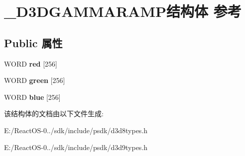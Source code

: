 \hypertarget{struct___d3_d_g_a_m_m_a_r_a_m_p}{}\section{\+\_\+\+D3\+D\+G\+A\+M\+M\+A\+R\+A\+M\+P结构体 参考}
\label{struct___d3_d_g_a_m_m_a_r_a_m_p}
\subsection*{Public 属性}
\begin{DoxyCompactItemize}
\item 
\mbox{\label{struct___d3_d_g_a_m_m_a_r_a_m_p_ae79ba9b3cac1e68a6ad7652c7656b326}} 
W\+O\+RD {\bfseries red} \mbox{[}256\mbox{]}
\item 
\mbox{\label{struct___d3_d_g_a_m_m_a_r_a_m_p_ac8f26de7d35e10bb998ff7939c88db70}} 
W\+O\+RD {\bfseries green} \mbox{[}256\mbox{]}
\item 
\mbox{\label{struct___d3_d_g_a_m_m_a_r_a_m_p_a4b75736477790d095dc1954ff6c8ed4e}} 
W\+O\+RD {\bfseries blue} \mbox{[}256\mbox{]}
\end{DoxyCompactItemize}


该结构体的文档由以下文件生成\+:\begin{DoxyCompactItemize}
\item 
E\+:/\+React\+O\+S-\/0../sdk/include/psdk/d3d8types.\+h\item 
E\+:/\+React\+O\+S-\/0../sdk/include/psdk/d3d9types.\+h\end{DoxyCompactItemize}
